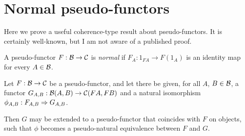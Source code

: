 \documentclass{robinthesisdraft}
\begin{document}
\section{Normal pseudo-functors}
Here we prove a useful coherence-type result about pseudo-functors.
It is certainly well-known, but I am not aware of a published proof.%
\begin{definition} %
	A pseudo-functor $F:\mathcal{B}\to\mathcal{C}$ is \emph{normal} if
	$F_A: 1_{FA}\to F(1_A)$ is an identity map for every $A\in\mathcal{B}$.
\end{definition}
\begin{lemma}\label{l-normal}
	Let $F:\mathcal{B}\to\mathcal{C}$ be a pseudo-functor, and let there be given,
	for all $A$, $B\in\mathcal{B}$, a functor $G_{A,B}: \mathcal{B}(A,B)\to\mathcal{C}(FA,FB)$
	and a natural isomorphism $\phi_{A,B}: F_{A,B}\Rightarrow G_{A,B}$.
	
	Then $G$ may be extended to a pseudo-functor that coincides
	with $F$ on objects, such that $\phi$ becomes a pseudo-natural
	equivalence between $F$ and $G$.
\end{lemma}
\end{document}
